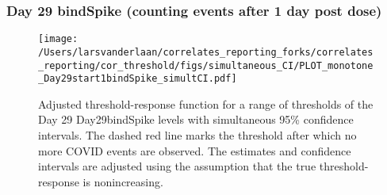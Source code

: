 \documentclass[]{article}
\begin{document}
\clearpage
\clearpage

\clearpage

\hypertarget{day-29-bindspike-counting-events-after-1-day-post-dose-3}{%
\subsubsection{Day 29 bindSpike (counting events after 1 day post
dose)}\label{day-29-bindspike-counting-events-after-1-day-post-dose-3}}

\begin{figure}[H]
\centering
\texttt{[image: /Users/larsvanderlaan/correlates\_reporting\_forks/correlates\_reporting/cor\_threshold/figs/simultaneous\_CI/PLOT\_monotone\_Day29start1bindSpike\_simultCI.pdf]}
\caption{Adjusted threshold-response function for a range of thresholds of the
  Day 29 Day29bindSpike levels with simultaneous 95\% confidence intervals. The dashed red line marks the threshold after which no more COVID events are observed. The estimates and confidence intervals are adjusted using the assumption that the true threshold-response is nonincreasing.}
\end{figure}
\end{document}
